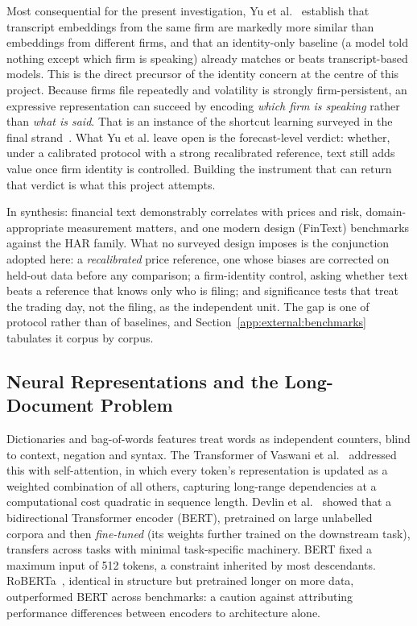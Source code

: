 Most consequential for the present investigation, Yu et al.~\cite{yu2025samecompany} establish that transcript embeddings from the same firm are markedly more similar than embeddings from different firms, and that an identity-only baseline (a model told nothing except which firm is speaking) already matches or beats transcript-based models. This is the direct precursor of the identity concern at the centre of this project. Because firms file repeatedly and volatility is strongly firm-persistent, an expressive representation can succeed by encoding \emph{which firm is speaking} rather than \emph{what is said}. That is an instance of the shortcut learning surveyed in the final strand~\cite{geirhos2020shortcut}. What Yu et al. leave open is the forecast-level verdict: whether, under a calibrated protocol with a strong recalibrated reference, text still adds value once firm identity is controlled. Building the instrument that can return that verdict is what this project attempts.

In synthesis: financial text demonstrably correlates with prices and risk, domain-appropriate measurement matters, and one modern design (FinText) benchmarks against the HAR family. What no surveyed design imposes is the conjunction adopted here: a \emph{recalibrated} price reference, one whose biases are corrected on held-out data before any comparison; a firm-identity control, asking whether text beats a reference that knows only who is filing; and significance tests that treat the trading day, not the filing, as the independent unit. The gap is one of protocol rather than of baselines, and Section~\ref{app:external:benchmarks} tabulates it corpus by corpus. %

\subsection{Neural Representations and the Long-Document Problem}
\label{sec:bg-neural}

Dictionaries and bag-of-words features treat words as independent counters, blind to context, negation and syntax. The Transformer of Vaswani et al.~\cite{vaswani2017attention} addressed this with self-attention, in which every token's representation is updated as a weighted combination of all others, capturing long-range dependencies at a computational cost quadratic in sequence length. Devlin et al.~\cite{devlin2019bert} showed that a bidirectional Transformer encoder (BERT), pretrained on large unlabelled corpora and then \emph{fine-tuned} (its weights further trained on the downstream task), transfers across tasks with minimal task-specific machinery. BERT fixed a maximum input of 512 tokens, %
a constraint inherited by most descendants. RoBERTa~\cite{liu2019roberta}, identical in structure but pretrained longer on more data, outperformed BERT across benchmarks: a caution against attributing performance differences between encoders to architecture alone.

